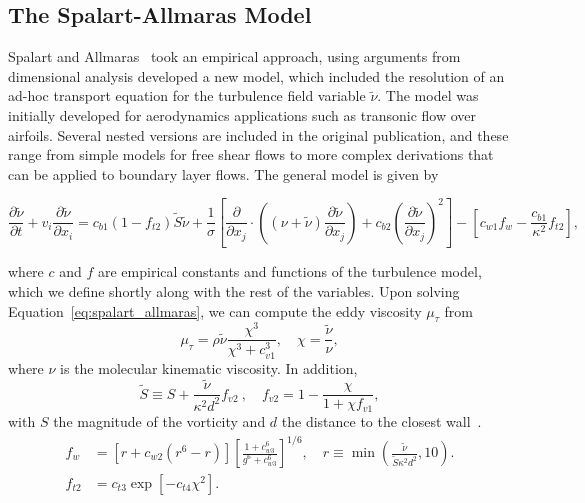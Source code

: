 \subsection{The Spalart-Allmaras Model}
Spalart and Allmaras~\cite{} took an empirical approach, using arguments from dimensional analysis developed a new model, which included the resolution of an ad-hoc transport equation for the turbulence field variable $\tilde \nu$. The model was initially developed for aerodynamics applications such as transonic flow over airfoils. Several nested versions are included in the original publication, and these range from simple models for free shear flows to more complex derivations that can be applied to boundary layer flows. The general model is given by
\begin{eqBox}
\begin{equation}
    \frac{\partial \tilde{\nu}}{\partial t} 
    + v_i \frac{\partial\tilde\nu}{\partial x_i} 
    = c_{b1} (1-f_{t2}) \tilde S \tilde \nu
    + \frac{1}{\sigma} 
     \left[ \frac{\partial}{\partial x_j} \cdot \left((\nu + \tilde \nu)\frac{\partial\tilde\nu}{\partial x_j} \right) 
      + c_{b2}\left(\frac{\partial\tilde \nu}{\partial x_j} \right)^2\right]
    - \left[c_{w1}f_w - \frac{c_{b1}}{\kappa^2}f_{t2}\right],
    \label{eq:spalart_allmaras}
\end{equation}
\end{eqBox}
where $c$ and $f$ are empirical constants and functions of the turbulence model, which we define shortly along with the rest of the variables. Upon solving Equation~\ref{eq:spalart_allmaras}, we can compute the eddy viscosity $\mu_\tau$ from
\begin{equation}
    \mu_\tau=\rho \tilde \nu \frac{\chi^3}{\chi^3+c_{v1}^3},\quad \chi=\frac{\tilde \nu}{\nu},
    \label{eq:sa_eddyviscosity}
\end{equation}
where $\nu$ is the molecular kinematic viscosity. In addition,
\begin{equation}
    \tilde S \equiv S + \frac{\tilde \nu}{\kappa^2 d^2}f_{v2}~,\quad f_{v2}=1-\frac{\chi}{1+\chi f_{v1}},
\end{equation}
with $S$ the magnitude of the vorticity and $d$ the distance to the closest wall~\cite{spalartallmaras}. 
\begin{align}
    f_w&=\left[r+c_{w2}\left(r^6-r\right)\right]
    \left[\frac{1+c_{w3}^6}{g^6+c_{w3}^6}\right]^{1/6},\quad r\equiv \min\left(\frac{\tilde\nu}{\tilde S \kappa^2 d^2},10\right). \\
    f_{t2}&=c_{t3} \exp \left[-c_{t4}\chi^2\right].
\end{align}
